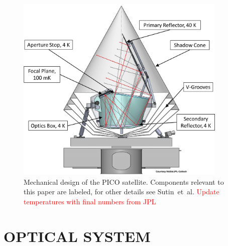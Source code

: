 \documentclass[]{spie}  %
\newcommand{\comr}[1]{\textcolor{red}{#1}}
\begin{document}
\begin{figure} [ht]
\begin{center}
\includegraphics[height=9cm]{PICO_CAD_annotated.png}
\end{center}
\caption { \label{fig:cad} 
Mechanical design of the PICO satellite. Components relevant to this paper are labeled, for other details see Sutin~et~al.\cite{brian_spie}%
\comr{Update temperatures with final numbers from JPL}}
\end{figure} 



\section{OPTICAL SYSTEM}
\label{sec:optics}
\end{document}
